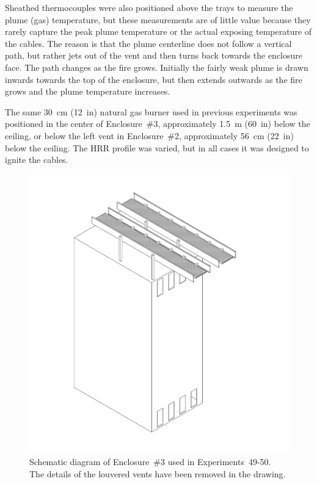 Sheathed thermocouples were also positioned above the trays to measure the plume (gas) temperature, but these measurements are of little value because they rarely capture the peak plume temperature or the actual exposing temperature of the cables. The reason is that the plume centerline does not follow a vertical path, but rather jets out of the vent and then turns back towards the enclosure face. The path changes as the fire grows. Initially the fairly weak plume is drawn inwards towards the top of the enclosure, but then extends outwards as the fire grows and the plume temperature increases.

The same 30~cm (12~in) natural gas burner used in previous experiments was positioned in the center of Enclosure~\#3, approximately 1.5~m (60~in) below the ceiling, or below the left vent in Enclosure~\#2, approximately 56~cm (22~in) below the ceiling. The HRR profile was varied, but in all cases it was designed to ignite the cables.

\begin{figure}[!ht]
\includegraphics[width=6.5in]{../FIGURES/Cabinet_3_with_Tray}
\caption[Schematic diagram of Tests 48-51]{Schematic diagram of Enclosure~\#3 used in Experiments~49-50. The details of the louvered vents have been removed in the drawing.}
\label{fig:Cabinet_3_3D}
\end{figure}

